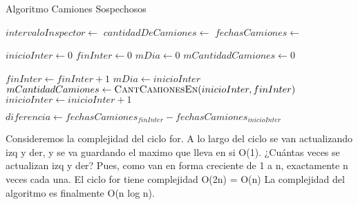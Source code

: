 \documentclass[11pt, a4paper, twoside]{article}
\begin{document}
\begin{algorithm}
\caption{Algoritmo Camiones Sospechosos}\label{logpascual}
\footnotesize\begin{algorithmic}[1]
	\Require
		\Statex $intervaloInspector \gets$  
		\Statex $cantidadDeCamiones \gets$  
		\Statex $fechasCamiones \gets$  
	\Ensure
		\Statex {} 
		\Statex {} 
	\Statex
	
  \State {} 
  \State $inicioInter \gets 0$ 
  \State $finInter \gets 0$ 
  \State $mDia \gets 0$ 
  \State $mCantidadCamiones \gets 0$ 

   
      \State $ finInter \gets finInter+1$
    \EndWhile 
   
    \State $ mDia \gets inicioInter$ 
    \State $ mCantidadCamiones \gets \Call{CantCamionesEn}{inicioInter,finInter}$ 
  \EndIf {}
  \State $inicioInter \gets inicioInter +1$
  \EndWhile {}
  \State {}
  \State


  \State {} 
	\EndFunction {}
  \State

    \State $diferencia \gets fechasCamiones_{finInter} - fechasCamiones_{inicioInter}$ 
    \State {} 
	\EndFunction {}

	\Statex{}
	
\end{algorithmic}
\end{algorithm}


Consideremos la complejidad del ciclo for. A lo largo del ciclo se van actualizando izq y der, y se va guardando el maximo que lleva  en si O(1).
¿Cuántas veces se actualizan izq y der? Pues, como van en forma creciente de 1 a n, exactamente n veces cada una. El ciclo for tiene complejidad O(2n) = O(n)
La complejidad del algoritmo es finalmente O(n log n).
\end{document}
